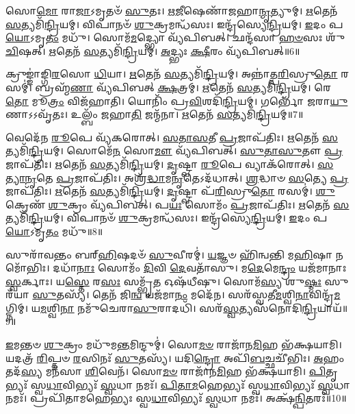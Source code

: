 𑌸𑍋\-\ul{𑌮𑍋} 𑌰𑌾\-\ul{𑌜𑌾}\-\-𑌽𑌮𑍃𑌤𑍞᳴ \ul{𑌸𑍁}\-𑌤𑌃।
\-\ul{𑌋}\-\-\ul{𑌜𑍀}\-𑌷𑍇𑌣𑌾᳴𑌜𑌹𑌾\-\ul{𑌨𑍍𑌮𑍃}\-𑌤𑍍𑌯𑍁𑌮𑍍।
\-\ul{𑌋}\-𑌤𑍇𑌨᳴ \ul{𑌸}\-𑌤𑍍𑌯𑌮𑌿᳴\-\ul{𑌨𑍍𑌦𑍍𑌰𑌿}\-𑌯𑌮𑍍।
𑌵𑌿𑌪𑌾𑌨𑍞᳴ \ul{𑌶𑍁}\-𑌕𑍍𑌰𑌮𑌨𑍍𑌧᳴𑌸𑌃।
𑌇𑌨𑍍𑌦𑍍𑌰᳴𑌸𑍍𑌯𑍇\-\ul{𑌨𑍍𑌦𑍍𑌰𑌿}\-𑌯𑌮𑍍।
\-\ul{𑌇}\-𑌦𑌂 𑌪\-\ul{𑌯𑍋}\-\-𑌽𑌮𑍃\-\ul{𑌤𑌂} 𑌮𑌧𑍁᳴।
𑌸𑍋𑌮᳴\-\ul{𑌮}\-𑌦𑍍𑌭𑍍𑌯𑍋 𑌵𑍍𑌯᳴𑌪𑌿𑌬𑌤𑍍।
𑌛𑌨𑍍𑌦᳴𑌸𑌾 \ul{𑌹}\-\-\ul{𑍞}\-𑌸𑌃 𑌶𑍁᳴\-\ul{𑌚𑌿}\-𑌷𑌤𑍍।
\-\ul{𑌋}\-𑌤𑍇𑌨᳴ \ul{𑌸}\-𑌤𑍍𑌯𑌮𑌿᳴\-\ul{𑌨𑍍𑌦𑍍𑌰𑌿}\-𑌯𑌮𑍍।
\-\ul{𑌅}\-𑌦𑍍𑌭𑍍𑌯𑌃 \ul{𑌕𑍍𑌷𑍀}\-𑌰𑌂 𑌵𑍍𑌯᳴𑌪𑌿𑌬𑌤𑍍॥6॥

𑌕𑍍𑌰𑍁𑌙𑍍𑌙𑌾॑𑌙𑍍𑌗𑌿\-\ul{𑌰}\-𑌸𑍋 \ul{𑌧𑌿}\-𑌯𑌾।
\-\ul{𑌋}\-𑌤𑍇𑌨᳴ \ul{𑌸}\-𑌤𑍍𑌯𑌮𑌿᳴\-\ul{𑌨𑍍𑌦𑍍𑌰𑌿}\-𑌯𑌮𑍍।
𑌅𑌨𑍍𑌨𑌾॑𑌤𑍍𑌪\-\ul{𑌰𑌿}\-𑌸𑍍𑌰𑍁\-\ul{𑌤𑍋} 𑌰𑌸𑌮𑍍॑।
𑌬𑍍𑌰𑌹𑍍𑌮᳴\-\ul{𑌣𑌾} 𑌵𑍍𑌯᳴𑌪𑌿𑌬𑌤𑍍 \ul{𑌕𑍍𑌷}\-𑌤𑍍𑌰𑌮𑍍।
\-\ul{𑌋}\-𑌤𑍇𑌨᳴ \ul{𑌸}\-𑌤𑍍𑌯𑌮𑌿᳴\-\ul{𑌨𑍍𑌦𑍍𑌰𑌿}\-𑌯𑌮𑍍।
𑌰𑍇\-\ul{𑌤𑍋} 𑌮𑍂\-\ul{𑌤𑍍𑌰𑌂} 𑌵𑌿𑌜᳴𑌹𑌾𑌤𑌿।
𑌯𑍋𑌨𑌿𑌂᳴ 𑌪𑍍𑌰\-\ul{𑌵𑌿}\-𑌶𑌦𑌿᳴\-\ul{𑌨𑍍𑌦𑍍𑌰𑌿}\-𑌯𑌮𑍍।
𑌗𑌰𑍍𑌭𑍋᳴ \ul{𑌜}\-𑌰𑌾\-\ul{𑌯𑍁}\-𑌣𑌾\-𑌽𑌽𑌵𑍃᳴𑌤𑌃।
𑌉𑌲𑍍𑌬𑌂᳴ 𑌜𑌹𑌾\-\ul{𑌤𑌿} 𑌜𑌨𑍍𑌮᳴𑌨𑌾।
\-\ul{𑌋}\-𑌤𑍇𑌨᳴ \ul{𑌸}\-𑌤𑍍𑌯𑌮𑌿᳴\-\ul{𑌨𑍍𑌦𑍍𑌰𑌿}\-𑌯𑌮𑍍॥7॥

𑌵𑍇𑌦𑍇᳴𑌨 \ul{𑌰𑍂}\-𑌪𑍇 𑌵𑍍𑌯᳴𑌕𑌰𑍋𑌤𑍍।
\-\ul{𑌸}\-\-\ul{𑌤𑌾}\-\-\ul{𑌸}\-𑌤𑍀 \ul{𑌪𑍍𑌰}\-𑌜𑌾\-𑌪᳴𑌤𑌿𑌃।
\-\ul{𑌋}\-𑌤𑍇𑌨᳴ \ul{𑌸}\-𑌤𑍍𑌯𑌮𑌿᳴\-\ul{𑌨𑍍𑌦𑍍𑌰𑌿}\-𑌯𑌮𑍍।
𑌸𑍋𑌮𑍇᳴\-\ul{𑌨} 𑌸𑍋\-\ul{𑌮𑍗} 𑌵𑍍𑌯᳴𑌪𑌿𑌬𑌤𑍍।
\-\ul{𑌸𑍁}\-\-\ul{𑌤𑌾}\-\-\ul{𑌸𑍁}\-𑌤𑍗 \ul{𑌪𑍍𑌰}\-𑌜𑌾\-𑌪᳴𑌤𑌿𑌃।
\-\ul{𑌋}\-𑌤𑍇𑌨᳴ \ul{𑌸}\-𑌤𑍍𑌯𑌮𑌿᳴\-\ul{𑌨𑍍𑌦𑍍𑌰𑌿}\-𑌯𑌮𑍍।
\-\ul{𑌦𑍃}\-𑌷𑍍𑌟𑍍𑌵𑌾 \ul{𑌰𑍂}\-𑌪𑍇 𑌵𑍍𑌯𑌾𑌕᳴𑌰𑍋𑌤𑍍।
\-\ul{𑌸}\-\-\ul{𑌤𑍍𑌯𑌾}\-\-\ul{𑌨𑍃}\-𑌤𑍇 \ul{𑌪𑍍𑌰}\-𑌜𑌾\-𑌪᳴𑌤𑌿𑌃।
𑌅𑌶𑍍𑌰᳴\-\ul{𑌦𑍍𑌧𑌾}\-𑌮\-\ul{𑌨𑍃}\-𑌤𑍇\-𑌽𑌦᳴𑌧𑌾𑌤𑍍।
\-\ul{𑌶𑍍𑌰}\-𑌦𑍍𑌧𑌾𑍞 \ul{𑌸}\-𑌤𑍍𑌯𑍇 \ul{𑌪𑍍𑌰}\-𑌜𑌾\-𑌪᳴𑌤𑌿𑌃।
\-\ul{𑌋}\-𑌤𑍇𑌨᳴ \ul{𑌸}\-𑌤𑍍𑌯𑌮𑌿᳴\-\ul{𑌨𑍍𑌦𑍍𑌰𑌿}\-𑌯𑌮𑍍।
\-\ul{𑌦𑍃}\-𑌷𑍍𑌟𑍍𑌵𑌾 𑌪᳴\-\ul{𑌰𑌿}\-𑌸𑍍𑌰𑍁\-\ul{𑌤𑍋} 𑌰𑌸𑌮𑍍॑।
\-\ul{𑌶𑍁}\-𑌕𑍍𑌰𑍇𑌣᳴ \ul{𑌶𑍁}\-𑌕𑍍𑌰𑌂 𑌵𑍍𑌯᳴𑌪𑌿𑌬𑌤𑍍।
𑌪\-\ul{𑌯𑌃} 𑌸𑍋𑌮𑌂᳴ \ul{𑌪𑍍𑌰}\-𑌜𑌾\-𑌪᳴𑌤𑌿𑌃।
\-\ul{𑌋}\-𑌤𑍇𑌨᳴ \ul{𑌸}\-𑌤𑍍𑌯𑌮𑌿᳴\-\ul{𑌨𑍍𑌦𑍍𑌰𑌿}\-𑌯𑌮𑍍।
𑌵𑌿𑌪𑌾𑌨𑍞᳴ \ul{𑌶𑍁}\-𑌕𑍍𑌰𑌮𑌨𑍍𑌧᳴𑌸𑌃।
𑌇𑌨𑍍𑌦𑍍𑌰᳴𑌸𑍍𑌯𑍇\-\ul{𑌨𑍍𑌦𑍍𑌰𑌿}\-𑌯𑌮𑍍।
\-\ul{𑌇}\-𑌦𑌂 𑌪\-\ul{𑌯𑍋}\-\-𑌽𑌮𑍃\-\ul{𑌤𑌂} 𑌮𑌧𑍁᳴॥8॥\anuvakamend[\-\ul{𑌅}\-𑌦𑍍𑌭𑍍𑌯𑌃 \ul{𑌕𑍍𑌷𑍀}\-𑌰𑌂 𑌵𑍍𑌯᳴𑌪𑌿\-\ul{𑌬}\-𑌜𑍍𑌜𑌨𑍍𑌮᳴\-\ul{𑌨}\-𑌰𑍍𑌤𑍇𑌨᳴ \ul{𑌸}\-𑌤𑍍𑌯𑌮𑌿᳴\-\ul{𑌨𑍍𑌦𑍍𑌰𑌿}\-𑌯𑍟 \ul{𑌶𑍍𑌰}\-𑌦𑍍𑌧𑌾𑍞 \ul{𑌸}\-𑌤𑍍𑌯𑍇 \ul{𑌪𑍍𑌰}\-𑌜𑌾𑌪᳴𑌤𑌿\-\ul{𑌰}\-𑌷𑍍𑌟𑍗 𑌚᳴]

𑌸𑍁𑌰𑌾᳴𑌵𑌨𑍍𑌤𑌂 𑌬𑌰𑍍‌\mbox{}\-\ul{𑌹𑌿}\-𑌷𑌦𑍞᳴ \ul{𑌸𑍁}\-𑌵𑍀𑌰𑌮𑍍॑।
\-\ul{𑌯}\-𑌜𑍍𑌞𑍞 𑌹𑌿᳴𑌨𑍍𑌵𑌨𑍍𑌤𑌿 𑌮\-\ul{𑌹𑌿}\-𑌷𑌾 𑌨𑌮𑍋᳴𑌭𑌿𑌃।
𑌦𑌧𑌾᳴\-\ul{𑌨𑌾𑌃} 𑌸𑍋𑌮𑌂᳴ \ul{𑌦𑌿}\-𑌵𑌿 \ul{𑌦𑍇}\-𑌵𑌤𑌾᳴𑌸𑍁।
𑌮\-\ul{𑌦𑍇}\-𑌮𑍇\-\ul{𑌨𑍍𑌦𑍍𑌰𑌂} 𑌯𑌜᳴𑌮𑌾𑌨𑌾𑌃 \ul{𑌸𑍍𑌵}\-𑌰𑍍𑌕𑌾𑌃।
𑌯\-\ul{𑌸𑍍𑌤𑍇} 𑌰\-\ul{𑌸𑌃} 𑌸𑌮𑍍𑌭𑍃᳴\-\ul{𑌤} 𑌓𑌷᳴𑌧𑍀𑌷𑍁।
𑌸𑍋𑌮᳴\-\ul{𑌸𑍍𑌯} 𑌶𑍁\-\ul{𑌷𑍍𑌮𑌃} 𑌸𑍁𑌰᳴𑌯𑌾 \ul{𑌸𑍁}\-𑌤𑌸𑍍𑌯᳴।
𑌤𑍇𑌨᳴ 𑌜𑌿\-\ul{𑌨𑍍𑌵} 𑌯𑌜᳴𑌮𑌾\-\ul{𑌨𑌂} 𑌮𑌦𑍇᳴𑌨।
𑌸𑌰᳴𑌸𑍍𑌵𑌤𑍀\-\ul{𑌮}\-𑌶𑍍𑌵𑌿\-\ul{𑌨𑌾}\-𑌵𑌿𑌨𑍍𑌦𑍍𑌰᳴\-\ul{𑌮}\-𑌗𑍍𑌨𑌿𑌮𑍍।
𑌯\-\ul{𑌮}\-𑌶𑍍𑌵𑌿\-\ul{𑌨𑌾} 𑌨𑌮𑍁᳴𑌚𑍇𑌰𑌾\-\ul{𑌸𑍁}\-𑌰𑌾𑌦𑌧𑌿᳴।
𑌸𑌰᳴\-\ul{𑌸𑍍𑌵}\-𑌤𑍍𑌯𑌸᳴𑌨𑍋𑌦𑌿\-\ul{𑌨𑍍𑌦𑍍𑌰𑌿}\-𑌯𑌾𑌯᳴॥9॥

\-\ul{𑌇}\-𑌮𑌨𑍍𑌤𑍞 \ul{𑌶𑍁}\-𑌕𑍍𑌰𑌂 𑌮𑌧𑍁᳴𑌮\-\ul{𑌨𑍍𑌤}\-𑌮𑌿𑌨𑍍𑌦𑍁𑌮𑍍॑।
𑌸𑍋\-\ul{𑌮}\-\-\ul{𑍞} 𑌰𑌾𑌜𑌾᳴𑌨\-\ul{𑌮𑌿}\-𑌹 𑌭᳴𑌕𑍍𑌷𑌯𑌾𑌮𑌿।
𑌯𑌦𑌤𑍍𑌰᳴ \ul{𑌰𑌿}\-𑌪𑍍𑌤𑍞 \ul{𑌰}\-𑌸𑌿𑌨𑌃᳴ \ul{𑌸𑍁}\-𑌤𑌸𑍍𑌯᳴।
𑌯𑌦𑌿\-\ul{𑌨𑍍𑌦𑍍𑌰𑍋} 𑌅𑌪𑌿᳴\-\ul{𑌬}\-𑌚𑍍𑌛𑌚𑍀᳴𑌭𑌿𑌃।
\-\ul{𑌅}\-𑌹𑌂 𑌤𑌦᳴\-\ul{𑌸𑍍𑌯} 𑌮𑌨᳴𑌸𑌾 \ul{𑌶𑌿}\-𑌵𑍇𑌨᳴।
𑌸𑍋\-\ul{𑌮}\-\-\ul{𑍞} 𑌰𑌾𑌜𑌾᳴𑌨\-\ul{𑌮𑌿}\-𑌹 𑌭᳴𑌕𑍍𑌷𑌯𑌾𑌮𑌿।
\-\ul{𑌪𑌿}\-𑌤𑍃𑌭𑍍𑌯𑌃᳴ 𑌸𑍍𑌵\-\ul{𑌧𑌾}\-𑌵𑌿𑌭𑍍𑌯𑌃᳴ \ul{𑌸𑍍𑌵}\-𑌧𑌾 𑌨𑌮𑌃᳴।
\-\ul{𑌪𑌿}\-\-\ul{𑌤𑌾}\-\-\ul{𑌮}\-𑌹𑍇𑌭𑍍𑌯𑌃᳴ 𑌸𑍍𑌵\-\ul{𑌧𑌾}\-𑌵𑌿𑌭𑍍𑌯𑌃᳴ \ul{𑌸𑍍𑌵}\-𑌧𑌾 𑌨𑌮𑌃᳴।
𑌪𑍍𑌰𑌪𑌿᳴𑌤𑌾𑌮𑌹𑍇𑌭𑍍𑌯𑌃 𑌸𑍍𑌵\-\ul{𑌧𑌾}\-𑌵𑌿𑌭𑍍𑌯𑌃᳴ \ul{𑌸𑍍𑌵}\-𑌧𑌾 𑌨𑌮𑌃᳴।
𑌅𑌕𑍍𑌷᳴\-\ul{𑌨𑍍𑌪𑌿}\-𑌤𑌰𑌃᳴॥10॥

